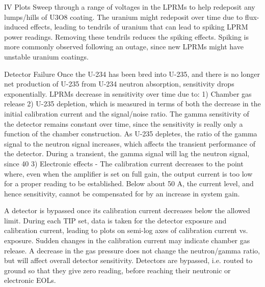\documentclass[10pt]{article}
\begin{document}
IV Plots
Sweep through a range of voltages in the LPRMs to help redeposit any lumps/hills of U3O8 coating. The uranium might redeposit over time due to flux-induced effects, leading to tendrils of uranium that can lead to spiking LPRM power readings. Removing these tendrils reduces the spiking effects. Spiking is more commonly observed following an outage, since new LPRMs might have unstable uranium coatings. 

Detector Failure
Once the U-234 has been bred into U-235, and there is no longer net production of U-235 from U-234 neutron absorption, sensitivity drops exponentially. LPRMs decrease in sensitivity over time due to:
1)	Chamber gas release	
2)	U-235 depletion, which is measured in terms of both the decrease in the initial calibration current and the signal/noise ratio. The gamma sensitivity of the detector remains constant over time, since the sensitivity is really only a function of the chamber construction. As U-235 depletes, the ratio of the gamma signal to the neutron signal increases, which affects the transient performance of the detector. During a transient, the gamma signal will lag the neutron signal, since 40%
3)	Electronic effects - The calibration current decreases to the point where, even when the amplifier is set on full gain, the output current is too low for a proper reading to be established. Below about 50 A, the current level, and hence sensitivity, cannot be compensated for by an increase in system gain. 

A detector is bypassed once its calibration current decreases below the allowed limit. During each TIP set, data is taken for the detector exposure and calibration current, leading to plots on semi-log axes of calibration current vs. exposure. Sudden changes in the calibration current may indicate chamber gas release. A decrease in the gas pressure does not change the neutron/gamma ratio, but will affect overall detector sensitivity. Detectors are bypassed, i.e. routed to ground so that they give zero reading, before reaching their neutronic or electronic EOLs. 
\end{document}
